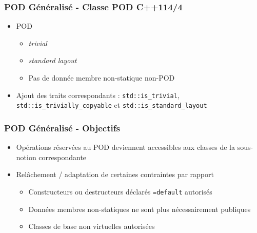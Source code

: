 \documentclass[C++.tex]{subfiles}
\begin{document}
\begin{frame}[fragile]
	\frametitle{POD Généralisé - Classe POD C++11\titlehfill{}4/4}
	\begin{itemize}
		\item POD
		\begin{itemize}
			\item \textit{trivial}
			\item \textit{standard layout}
			\item Pas de donnée membre non-statique non-POD
		\end{itemize}
		\item Ajout des traits correspondants : \lstinline|std::is_trivial|, \lstinline|std::is_trivially_copyable| et \lstinline|std::is_standard_layout|
	\end{itemize}
\end{frame}

\begin{frame}[fragile]
	\frametitle{POD Généralisé - Objectifs}
	\begin{itemize}
		\item Opérations réservées au POD deviennent accessibles aux classes de la sous-notion correspondante
		\item Relâchement / adaptation de certaines contraintes par rapport
		\begin{itemize}
			\item Constructeurs ou destructeurs déclarés \lstinline|=default| autorisés
			\item Données membres non-statiques ne sont plus nécessairement publiques


			\item Classes de base non virtuelles autorisées

		\end{itemize}
	\end{itemize}
\end{frame}
\end{document}
